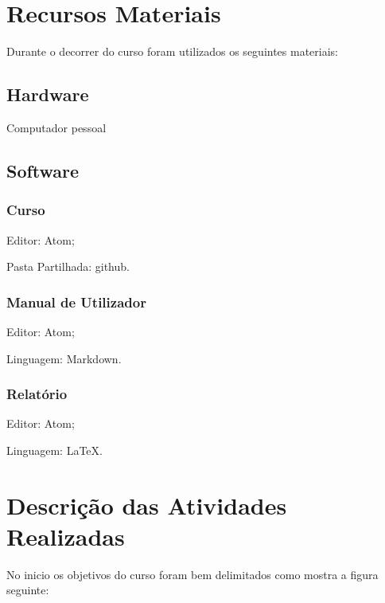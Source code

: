 \documentclass[12pt]{article}
\begin{document}
\section{Recursos Materiais}
Durante o decorrer do curso foram utilizados os seguintes materiais:

\subsection{Hardware}
\begin{list}{•}
\item Computador pessoal
\end{list}

\subsection{Software}

\subsubsection{Curso}
\begin{list}{•}
\item Editor: Atom;
\item
\item Pasta Partilhada: github.
\end{list}

\subsubsection{Manual de Utilizador}
\begin{list}{•}
  \item Editor: Atom;
  \item
  \item Linguagem: Markdown.
\end{list}


\subsubsection{Relatório}
\begin{list}{•}
\item Editor: Atom;
\item
\item Linguagem: LaTeX.

\end{list}

\section{Descrição das Atividades Realizadas}
No inicio os objetivos do curso foram bem delimitados como mostra a figura seguinte:
\end{document}
